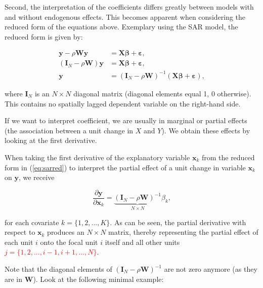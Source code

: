 \documentclass[
  letterpaper,
]{scrbook}
\begin{document}
Second, the interpretation of the coefficients differs greatly between
models with and without endogenous effects. This becomes apparent when
considering the reduced form of the equations above. Exemplary using the
SAR model, the reduced form is given by:

\[
\begin{split}
{\boldsymbol{\mathbf{y}}}-\rho{\boldsymbol{\mathbf{W}}}{\boldsymbol{\mathbf{y}}} &={\boldsymbol{\mathbf{X}}}{\boldsymbol{\mathbf{\beta}}}+ {\boldsymbol{\mathbf{\varepsilon}}}, \nonumber \\
({\boldsymbol{\mathbf{I}}_N}-\rho {\boldsymbol{\mathbf{W}}}){\boldsymbol{\mathbf{y}}} &={\boldsymbol{\mathbf{X}}}{\boldsymbol{\mathbf{\beta}}}+ {\boldsymbol{\mathbf{\varepsilon}}}\nonumber, \\
{\boldsymbol{\mathbf{y}}} &=({\boldsymbol{\mathbf{I}}_N}-\rho {\boldsymbol{\mathbf{W}}})^{-1}({\boldsymbol{\mathbf{X}}}{\boldsymbol{\mathbf{\beta}}}+ {\boldsymbol{\mathbf{\varepsilon}}}),
\end{split}
\]

where \({\boldsymbol{\mathbf{I}}_N}\) is an \(N \times N\) diagonal
matrix (diagonal elements equal 1, 0 otherwise). This contains no
spatially lagged dependent variable on the right-hand side.

If we want to interpret coefficient, we are usually in marginal or
partial effects (the association between a unit change in \(X\) and
\(Y\)). We obtain these effects by looking at the first derivative.

When taking the first derivative of the explanatory variable
\({\boldsymbol{\mathbf{x}}}_k\) from the reduced form in
(\ref{eq:sarred}) to interpret the partial effect of a unit change in
variable \({\boldsymbol{\mathbf{x}}}_k\) on
\({\boldsymbol{\mathbf{y}}}\), we receive

\[
\frac{\partial {\boldsymbol{\mathbf{y}}}}{\partial {\boldsymbol{\mathbf{x}}}_k}=\underbrace{({\boldsymbol{\mathbf{I}}_N}-\rho {\boldsymbol{\mathbf{W}}})^{-1}}_{N \times N}\beta_k,
\]

for each covariate \(k=\{1,2,...,K\}\). As can be seen, the partial
derivative with respect to \({\boldsymbol{\mathbf{x}}}_k\) produces an
\(N \times N\) matrix, thereby representing the partial effect of each
unit \(i\) onto the focal unit \(i\) itself and all other units
\textcolor{red}{$j=\{1,2,...,i-1,i+1,...,N\}$}.

Note that the diagonal elements of
\(({\boldsymbol{\mathbf{I}}_N}-\rho {\boldsymbol{\mathbf{W}}})^{-1}\)
are not zero anymore (as they are in \(\boldsymbol{\mathbf{W}}\)). Look
at the following minimal example:
\end{document}
